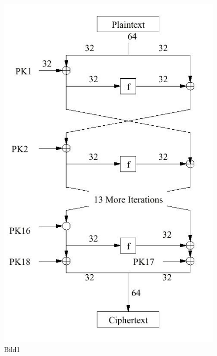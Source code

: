 \documentclass[10pt, a4paper]{scrreprt}
\begin{document}
\begin{figure}[htbp]
\begin{minipage}[t]{4cm}
\vspace{0pt}
\centering
\includegraphics[scale=0.3]{blowfish_1.JPG}
\caption{Bild1}
\label{fig:Bild1}
\end{minipage}
\hfill
\begin{minipage}[t]{10cm}


\end{minipage}
\end{figure}
\end{document}
